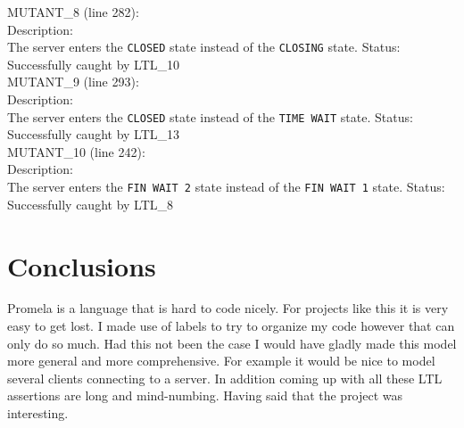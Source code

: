\documentclass{WigReport}
\begin{document}
MUTANT\_8 (line 282):\\
Description:\\
The server enters the \verb|CLOSED| state instead of the \verb|CLOSING| state.
Status: Successfully caught by LTL\_10
\\

MUTANT\_9 (line 293):\\
Description:\\
The server enters the \verb|CLOSED| state instead of the \verb|TIME WAIT| state.
Status: Successfully caught by LTL\_13
\\

MUTANT\_10 (line 242):\\
Description:\\
The server enters the \verb|FIN WAIT 2| state instead of the \verb|FIN WAIT 1| state.
Status: Successfully caught by LTL\_8
\\

\section{Conclusions}

Promela is a language that is hard to code nicely. For projects like this it
is very easy to get lost. I made use of labels to try to organize my code
however that can only do so much. Had this not been the case I would have
gladly made this model more general and more comprehensive. For example it
would be nice to model several clients connecting to a server. In addition
coming up with all these LTL assertions are long and mind-numbing. Having said
that the project was interesting.
\end{document}

